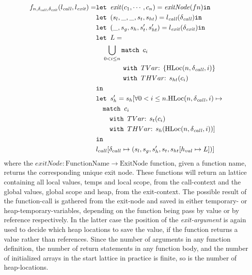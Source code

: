 \begin{align}
f_{n,\delta_{\mathit{call}}, \delta_{\mathit{exit}}}(l_{\mathit{call}}, l_{\mathit{exit}})=   &\texttt{let } \mathit{exit}(c_1, \cdots, c_n) = \mathit{exitNode}(fn) \texttt{in }\notag\\
                                                &\texttt{let } (s_l, \_, \_, s_t, s_{ht}) = l_{\mathit{call}}(\delta_{\mathit{call}}) \texttt{in }\notag\\
                                                &\texttt{let } (\_, s_g, s_h, s_t', s_{ht}') = l_{\mathit{exit}}(\delta_{\mathit{exit}}) \texttt{in }\notag\\
                                                &\texttt{let } L = \notag\\
                                                &\quad \bigcup_{0<i \leq n} \texttt{match }c_i\notag\\
                                                &\quad\quad\quad\quad \texttt{with }TVar\text{: } \{\text{HLoc}(n,\delta_{\mathit{call}}, i)\}\notag\\
                                                &\quad\quad\quad\quad \texttt{with }THVar\text{: } s_{ht}(c_i)\notag\\
                                                & \texttt{in }\notag\\
                                                &\texttt{let } s_h' = s_h[\forall 0 < i \leq n. \text{HLoc}(n,\delta_{\mathit{call}}, i) \mapsto\notag\\
                                                &\quad\texttt{match }c_i\notag\\
                                                &\quad\quad \texttt{with }TVar\text{: } s_t(c_i)\notag\\
                                                &\quad\quad \texttt{with }THVar\text{: } s_h(\text{HLoc}(n,\delta_{\mathit{call}}, i))]\notag\\
                                                & \texttt{in }\notag\\
                                                &l_{call}[\delta_{call}\mapsto (s_l,s_g,s_h', s_t, s_{ht}[h_{val}\mapsto L])]
\end{align}
where the $\mathit{exitNode} : \text{FunctionName} \rightarrow \text{ExitNode}$ function, given a function name, returns the corresponding unique exit node. These functions will return an lattice containing all local values, temps and local scope, from the call-context and the global values, global scope and heap, from the exit-context. The possible result of the function-call is gathered from the exit-node and saved in either temporary- or heap-temporary-variables, depending on the function being pass by value or by reference respectively. In the latter case the position of the \emph{exit-argument} is again used to decide which heap locations to save the value, if the function returns a value rather than references. Since the number of arguments  in any function definition, the number of return statements in any function body, and the number of initialized arrays in the start lattice in practice is finite, so is the number of heap-locations. 

